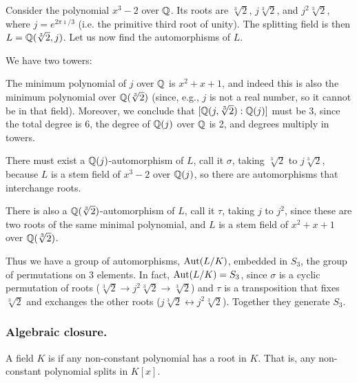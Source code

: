 Consider the polynomial $x^3 - 2$ over $\mathbb{Q}$. Its roots are $\sqrt[3]{2}$, $j \sqrt[3]{2}$, and $j^2 \sqrt[3]{2}$, where $j = e^{2\pi\imath / 3}$ (i.e. the primitive third root of unity). The splitting field is then $L = \mathbb{Q}(\sqrt[3]{2}, j)$. Let us now find the automorphisms of $L$.

We have two towers:

\begin{figure}[h]
\centering
{}
\end{figure}
The minimum polynomial of $j$ over $\mathbb{Q}$ is $x^2 + x + 1$, and indeed this is also the minimum polynomial over $\mathbb{Q}(\sqrt[3]{2})$ (since, e.g., $j$ is not a real number, so it cannot be in that field). Moreover, we conclude that $[\mathbb{Q}(j, \sqrt[3]{2}):\mathbb{Q}(j)]$ must be 3, since the total degree is 6, the degree of $\mathbb{Q}(j)$ over $\mathbb{Q}$ is 2, and degrees multiply in towers.

There must exist a $\mathbb{Q}(j)$-automorphism of $L$, call it $\sigma$, taking $\sqrt[3]{2}$ to $j \sqrt[3]{2}$, because $L$ is a stem field of $x^3 - 2$ over $\mathbb{Q}(j)$, so there are automorphisms that interchange roots. 

There is also a $\mathbb{Q}(\sqrt[3]{2})$-automorphism of $L$, call it $\tau$, taking $j$ to $j^2$, since these are two roots of the same minimal polynomial, and $L$ is a stem field of $x^2 + x + 1$ over $\mathbb{Q}(\sqrt[3]{2})$.

Thus we have a group of automorphisms, $\mathrm{Aut}(L/K)$, embedded in $S_3$, the group of permutations on 3 elements. In fact, $\mathrm{Aut}(L/K) = S_3$, since $\sigma$ is a cyclic permutation of roots ($\sqrt[3]{2} \to j^2 \sqrt[3]{2} \to \sqrt[3]{2}$) and $\tau$ is a transposition that fixes $\sqrt[3]{2}$ and exchanges the other roots ($j \sqrt[3]{2} \leftrightarrow j^2 \sqrt[3]{2}$). Together they generate $S_3$.

\subsubsection{Algebraic closure.}
\begin{defn}
A field $K$ is  if any non-constant polynomial has a root in $K$. That is, any non-constant polynomial splits in $K[x]$.
\end{defn}

